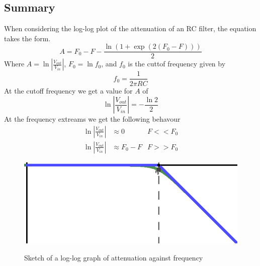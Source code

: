 \begin{framed}
\subsection*{Summary}
When considering the log-log plot of the attenuation of an RC filter, the equation
takes the form.
\begin{equation*}
  A = F_0 -F -\frac{\ln\left(1+\exp \left( 2 (F_0 - F) \right)\right)}{2}
\end{equation*}
Where $A=\ln \left|\frac{V_{out}}{V_{in}}\right|$, $F_0 = \ln f_0$, and $f_0$ is the cuttof frequency given by
\begin{equation*}
  f_0 = \frac{1}{2\pi R C}
\end{equation*}
At the cutoff frequency we get a value for $A$ of
\begin{equation*}
   \ln \left|\frac{V_{out}}{V_{in}}\right| = - \frac{\ln 2}{2}
\end{equation*}
At the frequency extreams we get the following behavour
\begin{align*}
  \ln \left|\frac{V_{out}}{V_{in}}\right| &\approx 0 & F<<F_0  \\
  \ln \left|\frac{V_{out}}{V_{in}}\right| &\approx F_0 -F &F>>F_0
\end{align*}
\end{framed}
\begin{figure}[h]
  \centering
\scalebox{1}
{\includegraphics{RC_log_log_plot.eps}} %
\caption{Sketch of a log-log graph of attenuation against frequency} \label{fig:RC_log_log_plot}
\end{figure}
